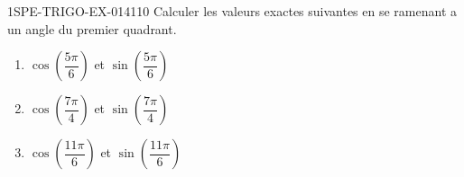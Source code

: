 \begin{exercice}{1SPE-TRIGO-EX-014}{1}{10}
Calculer les valeurs exactes suivantes en se ramenant a un angle du premier quadrant.
\begin{enumerate}
  \item $\cos\!\left(\dfrac{5\pi}{6}\right)$ et $\sin\!\left(\dfrac{5\pi}{6}\right)$
  \item $\cos\!\left(\dfrac{7\pi}{4}\right)$ et $\sin\!\left(\dfrac{7\pi}{4}\right)$
  \item $\cos\!\left(\dfrac{11\pi}{6}\right)$ et $\sin\!\left(\dfrac{11\pi}{6}\right)$
\end{enumerate}
\end{exercice}
